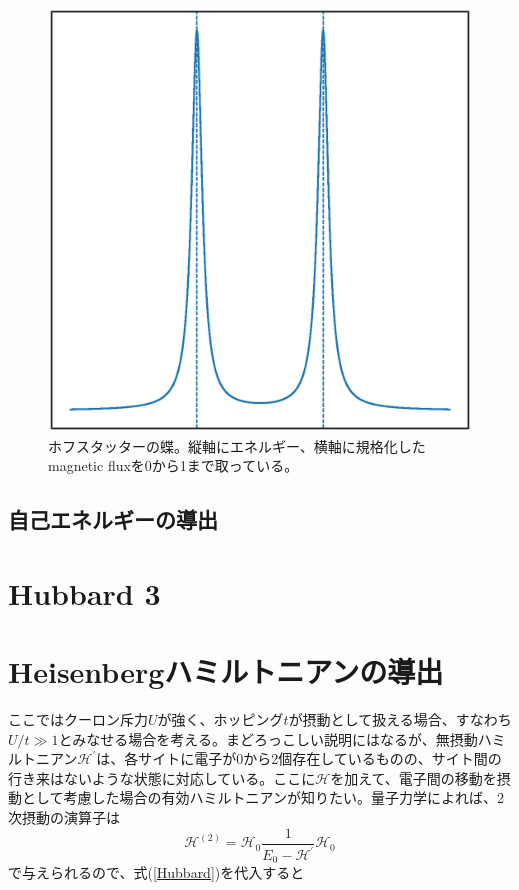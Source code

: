 \documentclass{jarticle}
\begin{document}
\begin{figure}[h]\label{fig:Hofstadter}
  \centering
  \includegraphics[width=\textwidth]{dos_atomic_limit_square.eps}
  \caption{ホフスタッターの蝶。縦軸にエネルギー、横軸に規格化したmagnetic fluxを0から1まで取っている。}
\end{figure}

\subsection{自己エネルギーの導出}
\section{Hubbard 3}

\section{Heisenbergハミルトニアンの導出}
ここではクーロン斥力$U$が強く、ホッピング$t$が摂動として扱える場合、すなわち$U/t \gg 1$とみなせる場合を考える。まどろっこしい説明にはなるが、無摂動ハミルトニアン$\mathcal{H}^{'}$は、各サイトに電子が0から2個存在しているものの、サイト間の行き来はないような状態に対応している。ここに$\mathcal{H}$を加えて、電子間の移動を摂動として考慮した場合の有効ハミルトニアンが知りたい。量子力学によれば、2次摂動の演算子は
\begin{equation}
  \mathcal{H}^{(2)} = \mathcal{H}_0 \frac{1}{E_0 - \mathcal{H}^{'}}\mathcal{H}_0
  \label{second perturbation}
\end{equation}
で与えられるので、式(\ref{Hubbard})を代入すると
\end{document}
